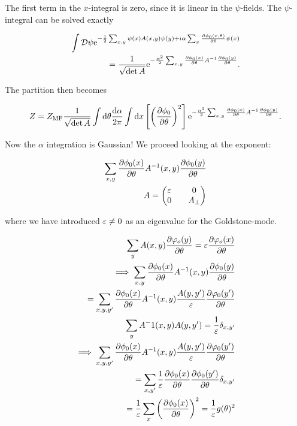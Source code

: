 The first term in the $x$-integral is zero, since it is linear in the $\psi$-fields. The $\psi$-integral can be solved exactly 

\begin{align*}
    \int \mathcal{D} \psi \mathrm{e}^{-\frac{1}{2}\sum_{x,y} \psi(x) A(x,y) \psi(y) + i\alpha \sum_x \pdv{\phi_0(x,\theta)}{\theta}\psi(x)} \\ 
    = \frac{1}{\sqrt{\det A}}\mathrm{e}^{-\frac{\alpha^2}{2}\sum_{x,y} \pdv{\phi_0(x)}{\theta}A^{-1}\pdv{\phi_0(y)}{\theta}}.
\end{align*}

The partition then becomes 

\begin{align*}
    Z = Z_{\text{MF}} \frac{1}{\sqrt{\det A}} \int \dd \theta \frac{\dd \alpha}{2\pi} \int \dd x \left[\left(\pdv{\phi_0}{\theta}\right)^2 \right] \mathrm{e}^{-\frac{\alpha^2}{2}\sum_{x,y} \pdv{\phi_0(x)}{\theta}A^{-1}\pdv{\phi_0(y)}{\theta}}.
\end{align*}

Now the $\alpha$ integration is Gaussian! We proceed looking at the exponent: 

\begin{align*}
    \sum_{x,y} \pdv{\phi_0(x)}{\theta}A^{-1}(x,y)\pdv{\phi_0(y)}{\theta} \\ 
    A = \begin{pmatrix} \varepsilon && 0 \\ 0 && A_{\perp} \end{pmatrix}
\end{align*}

where we have introduced $\varepsilon \neq 0$ as an eigenvalue for the Goldstone-mode. 

\begin{align*}
    \sum_y A(x,y) \pdv{\varphi_o(y)}{\theta} = \varepsilon \pdv{\varphi_o(x)}{\theta} \\ 
    \implies \sum_{x,y} \pdv{\phi_0(x)}{\theta}A^{-1}(x,y)\pdv{\phi_0(y)}{\theta} \\ 
    = \sum_{x,y,y'} \pdv{\phi_0(x)}{\theta}A^{-1}(x,y) \frac{A(y,y')}{\varepsilon} \pdv{\varphi_0(y')}{\theta} \\ 
    \sum_y A^-1(x,y)A(y,y') = \frac{1}{\varepsilon}\delta_{x,y'} \\
    \implies \sum_{x,y,y'} \pdv{\phi_0(x)}{\theta}A^{-1}(x,y) \frac{A(y,y')}{\varepsilon} \pdv{\varphi_0(y')}{\theta} \\ 
    = \sum_{x,y'} \frac{1}{\varepsilon}\pdv{\phi_0(x)}{\theta}\pdv{\phi_0(y')}{\theta}\delta_{x,y'} \\
    = \frac{1}{\varepsilon}\sum_x \left(\pdv{\phi_0(x)}{\theta}\right)^2 = \frac{1}{\varepsilon} g(\theta)^2
\end{align*}

